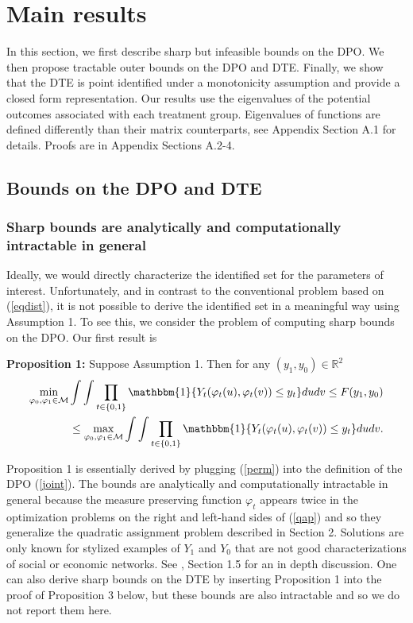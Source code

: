 \documentclass[12pt]{article}
\theoremstyle{definition}
\begin{document}
\section{Main results}
In this section, we first describe sharp but infeasible bounds on the DPO. We then propose tractable outer bounds on the DPO and DTE. Finally, we show that the DTE is point identified under a monotonicity assumption and provide a closed form representation. Our results use the eigenvalues of the potential outcomes associated with each treatment group. Eigenvalues of functions are defined differently than their matrix counterparts, see Appendix Section A.1 for details. Proofs are in Appendix Sections A.2-4.   


\subsection{Bounds on the DPO and DTE}

\subsubsection{Sharp bounds are analytically and computationally intractable in general}
Ideally, we would directly characterize the identified set for the parameters of interest. Unfortunately, and in contrast to the conventional problem based on (\ref{eqdist}), it is not possible to derive the identified set in a meaningful way using Assumption 1. To see this, we consider the problem of computing sharp bounds on the DPO. Our first result is 
\begin{flushleft} 
\textbf{Proposition 1:} Suppose Assumption 1. Then for any $(y_{1},y_{0}) \in \mathbb{R}^{2}$ 
\begin{align}\label{qap}
\min_{\varphi_{0},\varphi_{1} \in \mathcal{M}}\int\int \prod_{t \in \{0,1\}} \mathbbm{1}\{Y_{t}(\varphi_{t}(u),\varphi_{t}(v)) \leq y_{t}\}dudv 
\leq F(y_{1},y_{0}) \nonumber \\
\leq \max_{\varphi_{0},\varphi_{1} \in \mathcal{M}}\int\int \prod_{t \in \{0,1\}} \mathbbm{1}\{Y_{t}(\varphi_{t}(u),\varphi_{t}(v)) \leq y_{t}\}dudv.
\end{align} 
\end{flushleft}
Proposition 1 is essentially derived by plugging (\ref{perm}) into the definition of the DPO (\ref{joint}). The bounds are analytically and computationally intractable in general because the measure preserving function $\varphi_{t}$ appears twice in the optimization problems on the right and left-hand sides of (\ref{qap}) and so they generalize the quadratic assignment problem described in Section 2. Solutions are only known for stylized examples of $Y_{1}$ and $Y_{0}$ that are not good characterizations of social or economic networks. See \cite{cela2013quadratic}, Section 1.5 for an in depth discussion. One can also derive sharp bounds on the DTE by inserting Proposition 1 into the proof of Proposition 3 below, but these bounds are also intractable and so we do not report them here.  
\end{document}
